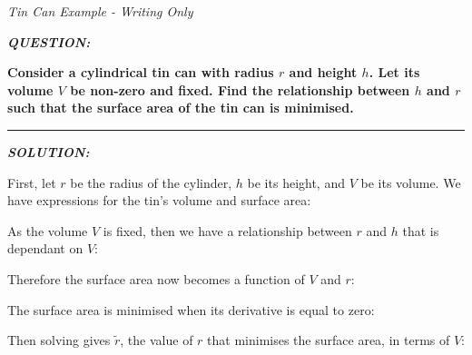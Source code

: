 \documentclass[12pt]{article}
\begin{document}
\begin{center}
\LARGE{\textit{Tin Can Example - Writing Only}}
\end{center}

\vspace{15mm}

\textbf{\textit{QUESTION:}}

\textbf{Consider a cylindrical tin can with radius $r$ and height $h$. Let its volume $V$ be non-zero and fixed. Find the relationship between $h$ and $r$ such that the surface area of the tin can is minimised.}

\vspace{5mm}
\hrule
\vspace{5mm}

\textbf{\textit{SOLUTION:}}

\vspace{5mm}

\begin{mdframed}[linewidth=0.5mm, backgroundcolor=orange!10]
First, let $r$ be the radius of the cylinder, $h$ be its height, and $V$ be its volume. We have expressions for the tin's volume and surface area:
\end{mdframed}

\vspace{10.5mm}

\begin{mdframed}[linewidth=0.5mm, backgroundcolor=orange!10]
As the volume $V$ is fixed, then we have a relationship between $r$ and $h$ that is dependant on $V$:
\end{mdframed}

\vspace{10.5mm}

\begin{mdframed}[linewidth=0.5mm, backgroundcolor=orange!10]
Therefore the surface area now becomes a function of $V$ and $r$:
\end{mdframed}

\vspace{10.5mm}

\begin{mdframed}[linewidth=0.5mm, backgroundcolor=orange!10]
The surface area is minimised when its derivative is equal to zero:
\end{mdframed}

\vspace{10.5mm}

\begin{mdframed}[linewidth=0.5mm, backgroundcolor=orange!10]
Then solving gives $\tilde{r}$, the value of $r$ that minimises the surface area, in terms of $V$:
\end{mdframed}
\end{document}
